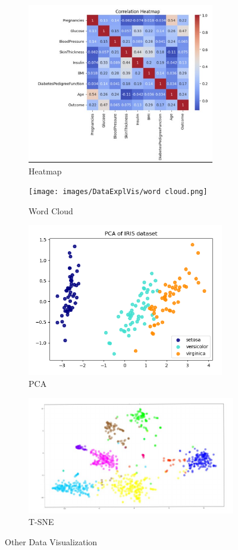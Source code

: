 \begin{figure}[H]
    \begin{subfigure}{.5\textwidth}
        \centering
        \includegraphics[width=.6\linewidth]{images/DataExplVis/heatmap.png}
        \caption{Heatmap}
        \label{fig:sub1}
    \end{subfigure}
    \begin{subfigure}{.5 \textwidth}
        \centering
        \texttt{[image: images/DataExplVis/word
        cloud.png]}
        \caption{Word Cloud}
        \label{fig:sub1}
    \end{subfigure}
    \begin{subfigure}{.5 \textwidth}
        \centering
        \includegraphics[width=.8\linewidth]{images/DataExplVis/pca.png}
        \caption{PCA}
        \label{fig:sub1}
    \end{subfigure}
    \begin{subfigure}{.5 \textwidth}
        \centering
        \includegraphics[width=.8\linewidth]{images/DataExplVis/t-sne.png}
        \caption{T-SNE}
        \label{fig:sub1}
    \end{subfigure}
    \caption{Other Data Visualization}
  \end{figure}

    



